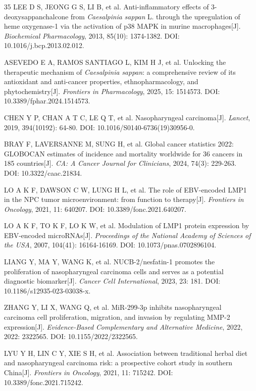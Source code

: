 \documentclass[12pt,a4paper]{article}
\begin{document}
{\begin{thebibliography}{35}
 LEE D S, JEONG G S, LI B, et al. Anti-inflammatory effects of 3-deoxysappanchalcone from \textit{Caesalpinia sappan} L. through the upregulation of heme oxygenase-1 via the activation of p38 MAPK in murine macrophages[J]. \textit{Biochemical Pharmacology}, 2013, 85(10): 1374-1382. DOI: 10.1016/j.bcp.2013.02.012.

 ASEVEDO E A, RAMOS SANTIAGO L, KIM H J, et al. Unlocking the therapeutic mechanism of \textit{Caesalpinia sappan}: a comprehensive review of its antioxidant and anti-cancer properties, ethnopharmacology, and phytochemistry[J]. \textit{Frontiers in Pharmacology}, 2025, 15: 1514573. DOI: 10.3389/fphar.2024.1514573.

 CHEN Y P, CHAN A T C, LE Q T, et al. Nasopharyngeal carcinoma[J]. \textit{Lancet}, 2019, 394(10192): 64-80. DOI: 10.1016/S0140-6736(19)30956-0.

 BRAY F, LAVERSANNE M, SUNG H, et al. Global cancer statistics 2022: GLOBOCAN estimates of incidence and mortality worldwide for 36 cancers in 185 countries[J]. \textit{CA: A Cancer Journal for Clinicians}, 2024, 74(3): 229-263. DOI: 10.3322/caac.21834.

 LO A K F, DAWSON C W, LUNG H L, et al. The role of EBV-encoded LMP1 in the NPC tumor microenvironment: from function to therapy[J]. \textit{Frontiers in Oncology}, 2021, 11: 640207. DOI: 10.3389/fonc.2021.640207.

 LO A K F, TO K F, LO K W, et al. Modulation of LMP1 protein expression by EBV-encoded microRNAs[J]. \textit{Proceedings of the National Academy of Sciences of the USA}, 2007, 104(41): 16164-16169. DOI: 10.1073/pnas.0702896104.

 LIANG Y, MA Y, WANG K, et al. NUCB-2/nesfatin-1 promotes the proliferation of nasopharyngeal carcinoma cells and serves as a potential diagnostic biomarker[J]. \textit{Cancer Cell International}, 2023, 23: 181. DOI: 10.1186/s12935-023-03038-x.

 ZHANG Y, LI X, WANG Q, et al. MiR-299-3p inhibits nasopharyngeal carcinoma cell proliferation, migration, and invasion by regulating MMP-2 expression[J]. \textit{Evidence-Based Complementary and Alternative Medicine}, 2022, 2022: 2322565. DOI: 10.1155/2022/2322565.

 LYU Y H, LIN C Y, XIE S H, et al. Association between traditional herbal diet and nasopharyngeal carcinoma risk: a prospective cohort study in southern China[J]. \textit{Frontiers in Oncology}, 2021, 11: 715242. DOI: 10.3389/fonc.2021.715242.


\end{thebibliography}}
\end{document}
